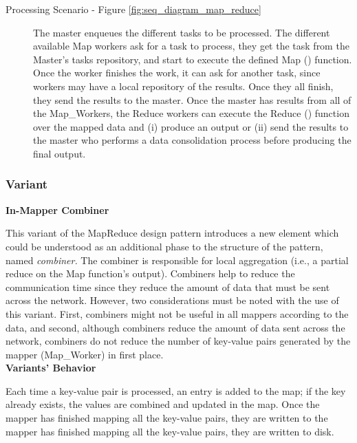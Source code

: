 
\begin{description}
	
	\item[Processing Scenario - Figure \ref{fig:seq_diagram_map_reduce}]
	The master enqueues the different tasks to be processed. The different available Map workers ask for a task to process, they get the task from the Master's tasks repository, and start to execute the defined Map () function. Once the worker finishes the work, it can ask for another task, since workers may have a local repository of the results. Once they all finish, they send the results to the master. Once the master has results from all of the Map\_Workers, the Reduce workers can execute the Reduce () function over the mapped data and (i) produce an output or (ii) send the results to the master who performs a data consolidation process before producing the final output.
	
\end{description}

\subsubsection{Variant}

\textbf{In-Mapper Combiner}

\noindent This variant of the MapReduce design pattern introduces a new element which could be understood as an additional phase to the structure of the pattern, named \textit{combiner. }The combiner is responsible for local aggregation (i.e., a partial reduce on the Map function's output). Combiners help to reduce the communication time since they reduce the amount of data that must be sent across the network. However, two considerations must be noted with the use of this variant. First, combiners might not be useful in all mappers according to the data, and second, although combiners reduce the amount of data sent across the network, combiners do not reduce the number of key-value pairs generated by the mapper (Map\_Worker) in first place.\\

\noindent\textbf{Variants' Behavior}

\noindent Each time a key-value pair is processed, an entry is added to the map; if the key already exists, the values are combined and updated in the map. Once the mapper has finished mapping all the key-value pairs, they are written to the mapper has finished mapping all the key-value pairs, they are written to disk.